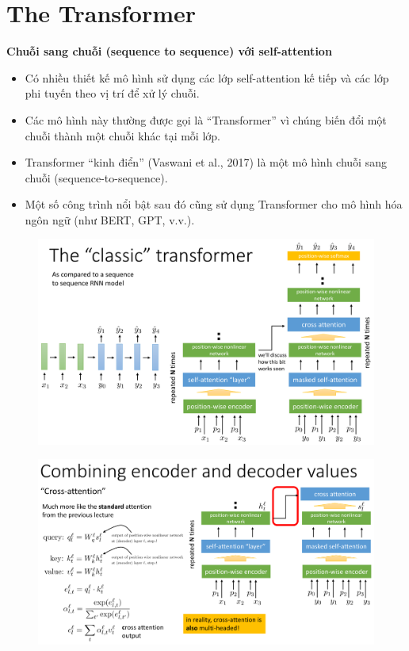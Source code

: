 \documentclass{book}
\begin{document}
\section{The Transformer}
\textbf{Chuỗi sang chuỗi (sequence to sequence) với self-attention}
\begin{itemize}
    \item Có nhiều thiết kế mô hình sử dụng các lớp self-attention kế tiếp và các lớp phi tuyến theo vị trí để xử lý chuỗi.
    \item Các mô hình này thường được gọi là ``Transformer'' vì chúng biến đổi một chuỗi thành một chuỗi khác tại mỗi lớp.
    \item Transformer ``kinh điển'' (Vaswani et al., 2017) là một mô hình chuỗi sang chuỗi (sequence-to-sequence).
    \item Một số công trình nổi bật sau đó cũng sử dụng Transformer cho mô hình hóa ngôn ngữ (như BERT, GPT, v.v.).
\end{itemize}
\begin{figure}[H]
    \centering
    \includegraphics[width=1.0\linewidth]{images/classic_trans.png}
\end{figure}
\begin{figure}[H]
    \centering
    \includegraphics[width=1.0\linewidth]{images/classic_trans1.png}
\end{figure}
\end{document}
